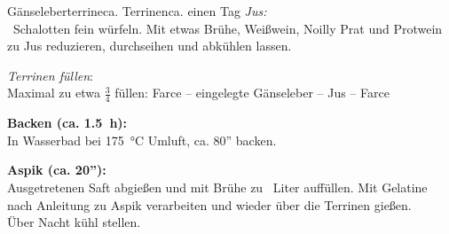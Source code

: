 \begin{MyRecipe}{Gänseleberterrine}{ca.  Terrinen}{ca. einen Tag}
	\textit{Jus:}\\	
	~Schalotten fein würfeln. Mit etwas Brühe, Weißwein, Noilly Prat und Protwein zu Jus reduzieren, durchseihen und abkühlen lassen.\par\medskip
	
	\textit{Terrinen füllen}:\\
	Maximal zu etwa $\frac34$ füllen: Farce -- eingelegte Gänseleber -- Jus -- Farce\par\bigskip
	
	\textbf{Backen (ca. 1.5~h):}\\
	In Wasserbad bei \SI{175}{\celsius} Umluft, ca. 80'' backen.\par\bigskip
	
	\textbf{Aspik (ca. 20''):}\\
	Ausgetretenen Saft abgießen und mit Brühe zu ~Liter auffüllen. Mit Gelatine nach Anleitung zu Aspik verarbeiten und wieder über die Terrinen gießen.\\
	Über Nacht kühl stellen.
	\par\bigskip

	
	
				
	\end{MyRecipe}